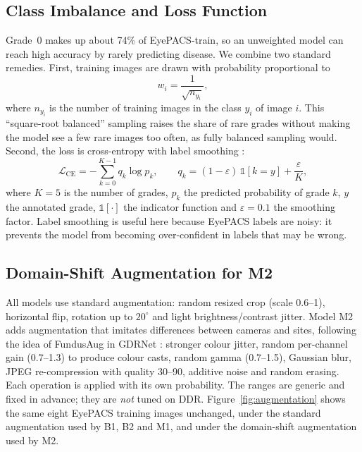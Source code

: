 \subsection{Class Imbalance and Loss Function}
\label{subsec:loss}

Grade~0 makes up about 74\% of EyePACS-train, so an unweighted model can reach high accuracy by rarely predicting disease. We combine two standard remedies. First, training images are drawn with probability proportional to
\begin{equation}
    w_i = \frac{1}{\sqrt{n_{y_i}}},
    \label{eq:sampler}
\end{equation}
where $n_{y_i}$ is the number of training images in the class $y_i$ of image $i$. This ``square-root balanced'' sampling raises the share of rare grades without making the model see a few rare images too often, as fully balanced sampling would. Second, the loss is cross-entropy with label smoothing \cite{labelsmooth2016}:
\begin{equation}
    \mathcal{L}_{\text{CE}} = -\sum_{k=0}^{K-1} q_k \log p_k,\qquad q_k = (1-\varepsilon)\,\mathbb{1}[k=y] + \frac{\varepsilon}{K},
    \label{eq:ce}
\end{equation}
where $K=5$ is the number of grades, $p_k$ the predicted probability of grade $k$, $y$ the annotated grade, $\mathbb{1}[\cdot]$ the indicator function and $\varepsilon=0.1$ the smoothing factor. Label smoothing is useful here because EyePACS labels are noisy: it prevents the model from becoming over-confident in labels that may be wrong.

\subsection{Domain-Shift Augmentation for M2}
\label{subsec:dg_aug}

All models use standard augmentation: random resized crop (scale 0.6--1), horizontal flip, rotation up to $20^\circ$ and light brightness/contrast jitter. Model M2 adds augmentation that imitates differences between cameras and sites, following the idea of FundusAug in GDRNet \cite{gdrnet2023}: stronger colour jitter, random per-channel gain (0.7--1.3) to produce colour casts, random gamma (0.7--1.5), Gaussian blur, JPEG re-compression with quality 30--90, additive noise and random erasing. Each operation is applied with its own probability. The ranges are generic and fixed in advance; they are \emph{not} tuned on DDR. Figure~\ref{fig:augmentation} shows the same eight EyePACS training images unchanged, under the standard augmentation used by B1, B2 and M1, and under the domain-shift augmentation used by M2.

